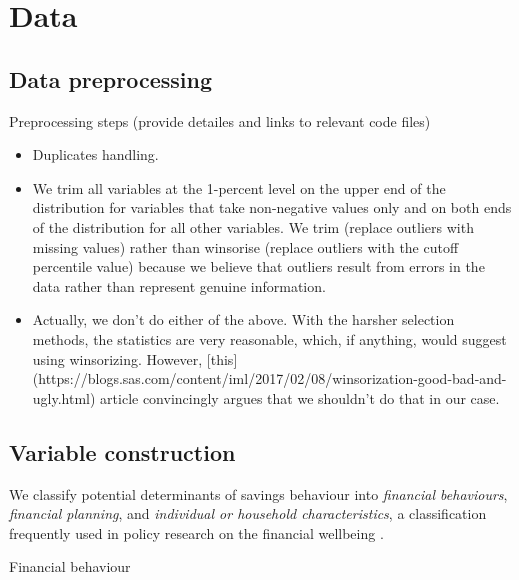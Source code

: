 
\section{Data}%
\label{sec:data}

\subsection{Data preprocessing}%
\label{sub:data_preprocessing}

Preprocessing steps
(provide detailes and links to relevant code files)
\begin{itemize}
    \item Duplicates handling.
    \item We trim all variables at the 1-percent level on the upper end of the
        distribution for variables that take non-negative values only and on
        both ends of the distribution for all other variables. We trim
        (replace outliers with missing values) rather than winsorise (replace
        outliers with the cutoff percentile value) because we believe that
        outliers result from errors in the data rather than represent genuine
        information.
    \item Actually, we don't do either of the above. With the harsher selection
        methods, the statistics are very reasonable, which, if anything, would
        suggest using winsorizing. However,
        [this](https://blogs.sas.com/content/iml/2017/02/08/winsorization-good-bad-and-ugly.html)
        article convincingly argues that we shouldn't do that in our case.
\end{itemize}

\subsection{Variable construction}%
\label{sub:variable_construction}

We classify potential determinants of savings behaviour into \textit{financial behaviours},
\textit{financial planning}, and \textit{individual or household
characteristics}, a classification frequently used in policy research on
the financial wellbeing \citep{can2019improving,cfpb2017financial, mps2018building}.

Financial behaviour

